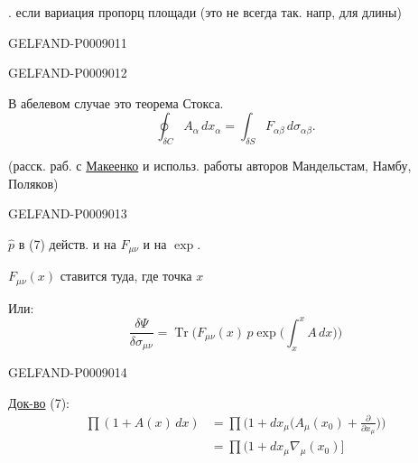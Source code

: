 . если вариация пропорц площади
(это не всегда так. напр, для длины)


\begin{GelfandAdjacentEvidence}{GELFAND-P000901}{1}
\end{GelfandAdjacentEvidence}
\begin{GelfandAdjacentEvidence}{GELFAND-P000901}{2}


В абелевом случае это теорема Стокса.
\begin{equation*}
\oint_{\delta C} A_\alpha\,dx_\alpha
=\int_{\delta S} F_{\alpha\beta}\,d\sigma_{\alpha\beta}.
\tag{9}
\end{equation*}

(расск. раб. с \underline{Макеенко} и использ. работы авторов Мандельстам, Намбу, Поляков)
\end{GelfandAdjacentEvidence}
\begin{GelfandAdjacentEvidence}{GELFAND-P000901}{3}


$\hat p$ в (7) действ. и на $F_{\mu\nu}$ и на $\exp$.

$F_{\mu\nu}(x)$ ставится туда, где точка $x$

Или:
\begin{equation*}
\frac{\delta\Psi}{\delta\sigma_{\mu\nu}}
=\operatorname{Tr}\biggl(F_{\mu\nu}(x)\,p\exp\biggl(\int_x^x A\,dx\biggr)\biggr)
\tag{10}
\end{equation*}
\end{GelfandAdjacentEvidence}
\begin{GelfandAdjacentEvidence}{GELFAND-P000901}{4}


\underline{Док-во} (7):
\begin{equation*}
\begin{aligned}
\prod(1+A(x)\,dx)
&=\prod\biggl(1+dx_\mu\biggl(A_\mu(x_0)+\frac{\partial}{\partial x_\mu}\biggr)\biggr)\\
&=\prod\bigl(1+dx_\mu\nabla_\mu(x_0)\bigr]
\end{aligned}
\tag{11}
\end{equation*}
\end{GelfandAdjacentEvidence}
